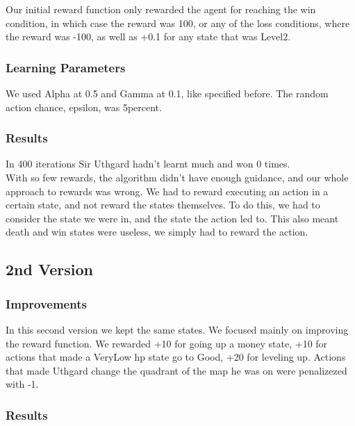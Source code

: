 \documentclass{article}
\begin{document}
  Our initial reward function only rewarded the agent for reaching the win condition, in which case the reward was 100, or any of the loss conditions,
  where the reward was -100, as well as +0.1 for any state that was Level2.\\

  \subsubsection{Learning Parameters}

  We used Alpha at 0.5 and Gamma at 0.1, like specified before. The random action chance, epsilon, was 5percent.\\

  \subsubsection{Results}

  In 400 iterations Sir Uthgard hadn't learnt much and won 0 times.\\
  With so few rewards, the algorithm didn't have enough guidance, and our whole approach to rewards was wrong. 
  We had to reward executing an action in a certain state, and not reward the states themselves. To do this, we had to consider the state we were in, and the state the action led to. 
  This also meant death and win states were useless, we simply had to reward the action.\\

  \subsection{2nd Version}

  \subsubsection{Improvements}

  In this second version we kept the same states. We focused mainly on improving the reward function.
  We rewarded +10 for going up a money state, +10 for actions that made a VeryLow hp state go to Good, +20 for leveling up. 
  Actions that made Uthgard change the quadrant of the map he was on were penalizezed with -1.

  \subsubsection{Results}
\end{document}
